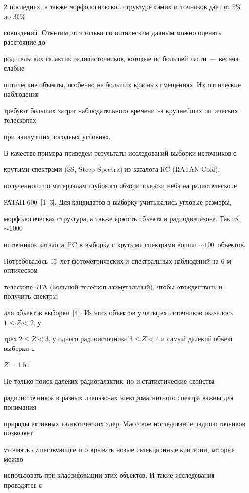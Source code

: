 \begin{multicols}{2}
последних, а также морфологической структуре самих источников дает от 5\% до 30\% 

совпадений. Отметим, что только по оптическим данным можно оценить расстояние до 

родительских галактик радиоисточников, которые по большей час\-ти~--- весь\-ма слабые 

оптические объекты, особенно на больших красных смещениях. Их оптические наблюдения 

требуют больших затрат наблюдательного времени на крупнейших оптических телескопах 

при наилучших погодных условиях.

      

      В качестве примера приведем результаты исследований выборки источников с 

крутыми спектрами (SS, {Steep Spectra}) из каталога RC ({RATAN Cold}), 

полученного по материалам глубокого обзора полоски неба на радиотелескопе 

      РАТАН-600~[1--3]. Для кандидатов в выборку учитывались угловые размеры, 

морфологическая структура, а также яркость объекта в радиодиапазоне. Так из $\sim1000$ 

источников каталога~RC в выборку с крутыми спектрами вошли $\sim100$~объектов. 

Потребовалось 15~лет фотометрических и спектральных наблюдений на 6-м оптическом 

телескопе БТА (Большой телескоп азимутальный), чтобы отождествить и получить спектры 

для объектов выборки~[4]. Из этих объектов у четырех источников оказалось $1 \leq Z<2$, у 

трех $2\leq Z<3$, у одного радиоисточника $3\leq Z< 4$ и самый далекий объект выборки с 

$Z=4.51$. 

      

      Не только поиск далеких радиогалактик, но и статистические свойства 

радиоисточников в разных диапазонах электромагнитного спектра важны для понимания 

природы активных галактических ядер. Массовое исследование радиоисточников позволяет 

уточнять существующие и открывать новые селекционные критерии, которые можно 

использовать при классификации этих объектов. И такие исследования проводятся с 


\end{multicols}
